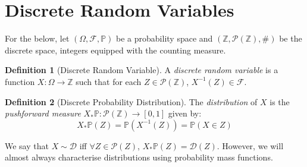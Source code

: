 \documentclass[a4paper,11pt,oneside]{book}
\theoremstyle{plain}
\theoremstyle{definition}
\newtheorem{defn}{Definition}[section]
\begin{document}
\section{Discrete Random Variables}
For the below, let $(\Omega, \mathcal{F},\mathbb{P})$ be a probability space and $(\mathbb{Z},\mathcal{P}(\mathbb{Z}),\#)$ be the discrete space, integers equipped with the counting measure.
\begin{defn}[Discrete Random Variable]
A \emph{discrete random variable} is a function $X:\Omega \rightarrow \mathbb{Z}$ such that for each $Z\in \mathcal{P}(\mathbb{Z})$, $X^{-1}(Z) \in \mathcal{F}$.
\end{defn}
\begin{defn}[Discrete Probability Distribution]
The \emph{distribution} of $X$ is the \emph{pushforward measure} $X_*\mathbb{P}:\mathcal{P}(\mathbb{Z})\rightarrow [0,1]$ given by: \[X_*\mathbb{P}(Z)=\mathbb{P}(X^{-1}(Z))=\mathbb{P}(X \in Z)\]
\end{defn}
We say that $X \sim \mathcal{D}$ iff $\forall Z \in \mathcal{P}(Z)$, $X_*\mathbb{P}(Z)=\mathcal{D}(Z)$. However, we will almost always characterise distributions using probability mass functions.
\end{document}

